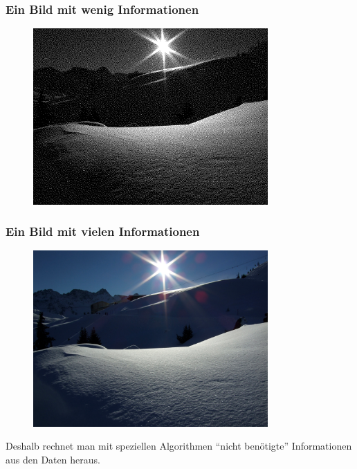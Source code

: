   \begin{frame}
  \frametitle{Ein Bild mit wenig Informationen}
    \begin{figure}
      \begin{center}  
        \includegraphics[width=0.8\textwidth]{pics/sw}
      \end{center}
    \end{figure}
  \end{frame}

  \begin{frame}
  \frametitle{Ein Bild mit vielen Informationen}
    \begin{figure}
      \begin{center}  
        \includegraphics[width=0.8\textwidth]{pics/farbe}
      \end{center}
    \end{figure}
  \end{frame}


  Deshalb rechnet man mit speziellen Algorithmen ``nicht benötigte'' Informationen aus den Daten heraus.

